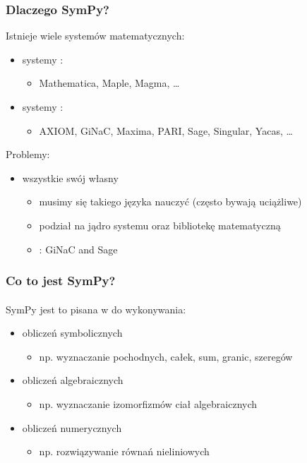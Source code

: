 \documentclass[10pt]{beamer}
\begin{document}
\begin{frame}[fragile]
    \frametitle{Dlaczego SymPy?}

    Istnieje wiele systemów matematycznych:
    \begin{itemize}
        \item systemy :
            \begin{itemize}
                \item Mathematica, Maple, Magma, \ldots
            \end{itemize}
        \item systemy :
            \begin{itemize}
                \item AXIOM, GiNaC, Maxima, PARI, Sage, Singular, Yacas, \ldots
            \end{itemize}
    \end{itemize}
    \pause
    {\color{red} Problemy:}
    \begin{itemize}
        \item wszystkie  swój własny 
            \begin{itemize}
                \item musimy się takiego języka nauczyć (często bywają uciążliwe)
                \item podział na jądro systemu oraz bibliotekę matematyczną
                \item {}: GiNaC and Sage
            \end{itemize}
        \pause
    \end{itemize}
\end{frame}

\begin{frame}[fragile]
    \frametitle{Co to jest SymPy?}
    \framesubtitle{}

    SymPy jest to  pisana w  do wykonywania:
    \begin{itemize}
        \pause
        \item obliczeń symbolicznych
            \begin{itemize}
                \item np. wyznaczanie pochodnych, całek, sum, granic, szeregów
            \end{itemize}
        \pause
        \item obliczeń algebraicznych
            \begin{itemize}
                \item np. wyznaczanie izomorfizmów ciał algebraicznych
            \end{itemize}
        \pause
        \item obliczeń numerycznych
            \begin{itemize}
                \item np. rozwiązywanie równań nieliniowych
            \end{itemize}
    \end{itemize}
\end{frame}
\end{document}
